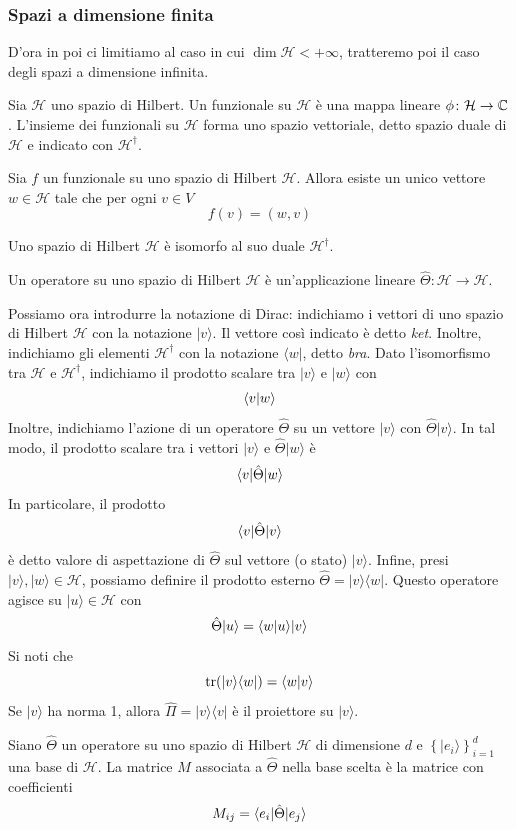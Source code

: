 \documentclass[a4paper, 11pt]{article}
\renewcommand{\H}{\mathcal{H}}
\renewcommand{\ket}[1]{| #1\rangle}
\renewcommand{\bra}[1]{\langle #1|}
\begin{document}
	\subsubsection{Spazi a dimensione finita}
	D'ora in poi ci limitiamo al caso in cui $\dim \H<+\infty$, tratteremo poi il caso degli spazi a dimensione infinita.
	\begin{definition}
		Sia $\H$ uno spazio di Hilbert. Un funzionale su $\H$ è una mappa lineare $\phi\colon \H \to\C $. L'insieme dei funzionali su $\H$ forma uno spazio vettoriale, detto spazio duale di $\H$ e indicato con $\H^\dagger$.
	\end{definition}
	\begin{theorem} Sia $f$ un funzionale su uno spazio di Hilbert $\H$. Allora esiste un unico vettore $w\in\H$ tale che per ogni $v\in V$
		\[f(v)=(w,v)\]
	\end{theorem}
	\begin{corollary}
		Uno spazio di Hilbert $\H$ è isomorfo al suo duale $\H^\dagger$.
	\end{corollary}
	\begin{definition}[Operatore]
		Un operatore su uno spazio di Hilbert $\H$ è un'applicazione lineare $\hat{\Theta}\colon\H \to\H$.
	\end{definition}
	Possiamo ora introdurre la notazione di Dirac: indichiamo i vettori di uno spazio di Hilbert $\H$ con la notazione $\ket{v}$. Il vettore così indicato è detto \textit{ket}. Inoltre, indichiamo gli elementi $\H^\dagger$ con la notazione $\bra{w}$, detto \textit{bra}. Dato l'isomorfismo tra $\H$ e $\H^\dagger$, indichiamo il prodotto scalare tra $\ket{v}$ e $\ket{w}$ con
	\[\langle v\vert w\rangle\]
	Inoltre, indichiamo l'azione di un operatore $\hat{\Theta}$ su un vettore $\ket{v}$ con $\hat{\Theta}\ket{v}$. In tal modo, il prodotto scalare tra i vettori $\ket{v}$ e $\hat\Theta\ket{w}$ è
	\[\langle v|\hat{\Theta}|w\rangle\]
	In particolare, il prodotto
	\[\langle v|\hat{\Theta}|v\rangle\]
	è detto valore di aspettazione di $\hat{\Theta}$ sul vettore (o stato) $\ket{v}$. Infine, presi $\ket{v},\ket{w}\in\H$, possiamo definire il prodotto esterno $\hat{\Theta}=\ket{v}\bra{w}$. Questo operatore agisce su $\ket{u}\in\H$ con
	\[\hat{\Theta}\ket{u}=\braket{w}{u}\ket{v}\]
	Si noti che
	\[\mathrm{tr}(\ket{v}\bra{w})=\braket{w}{v}\]
	Se $\ket{v}$ ha norma 1, allora $\hat\Pi=\ket{v}\bra{v}$ è il proiettore su $\ket{v}$.
	\begin{definition}
		Siano $\hat{\Theta}$ un operatore su uno spazio di Hilbert $\H$ di dimensione $d$ e $\left\{\ket{e_i}\right\}_{i=1}^{d}$ una base di $\H$. La matrice $M$ associata a $\hat{\Theta}$ nella base scelta è la matrice con coefficienti
		\[M_{ij}=\langle e_i|\hat{\Theta}|e_j\rangle\]
	\end{definition}
\end{document}
